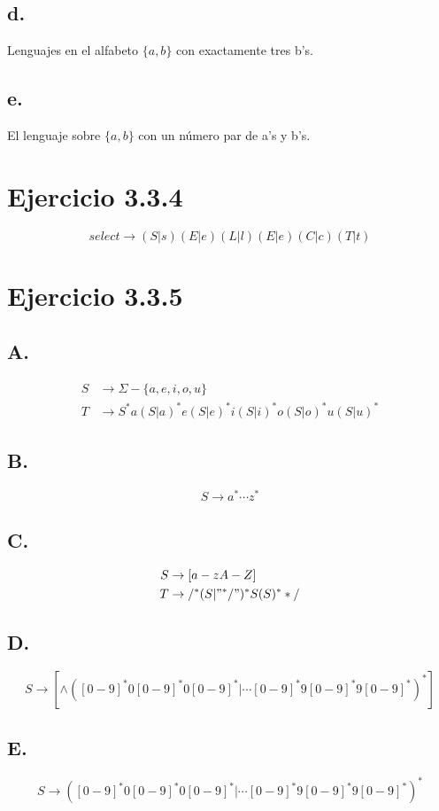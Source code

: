 \documentclass{article}
\begin{document}
\subsection*{d.} Lenguajes en el alfabeto $\{a,b\}$ con exactamente tres b's.
\subsection*{e.} El lenguaje sobre $\{a,b\}$ con un número par de a's y b's.
\section*{Ejercicio 3.3.4}
			$$ select \rightarrow (S|s)(E|e)(L|l)(E|e)(C|c)(T|t)$$
\section*{Ejercicio 3.3.5}
\subsection*{A.} 
\begin{equation}
	\begin{split}
		S & \rightarrow \Sigma - \{a,e,i,o,u\} \\
		T & \rightarrow S^* a (S|a)^* e (S|e)^* i (S|i)^* o (S|o)^* u (S|u)^*
	\end{split}
\end{equation}
\subsection*{B.}
$$S \rightarrow a^* \cdots z^*$$
\subsection*{C.}
\begin{equation}
	\begin{split}
		S & \rightarrow [a-zA-Z] \\
		T & \rightarrow /^*(S|"^*/")^*S(S)^**/ 
	\end{split}
\end{equation}
\subsection*{D.}

	$$ S \rightarrow [\wedge ([0-9]^* 0 [0-9]^* 0 [0-9]^*|\cdots [0-9]^*9[0-9]^*9[0-9]^*)^*] $$
\subsection*{E.}
	$$S \rightarrow ([0-9]^* 0 [0-9]^* 0 [0-9]^*|\cdots [0-9]^*9[0-9]^*9[0-9]^*)^*$$
\end{document}
